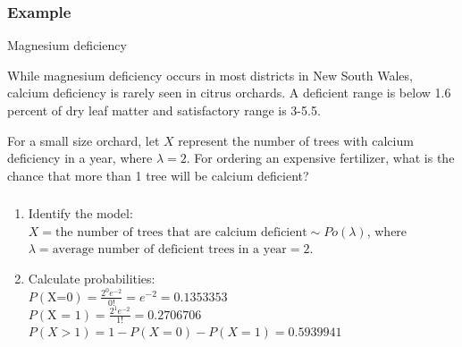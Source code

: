 \documentclass[t,xcolor=pdftex,dvipsnames,table]{beamer}
\begin{document}
\begin{frame}\frametitle{Example}
\begin{block}{Magnesium deficiency}

While magnesium deficiency occurs in most districts in New South Wales, calcium deficiency is rarely seen in citrus orchards. A deficient range is below 1.6 percent of dry leaf matter and satisfactory range is 3-5.5.

\vspace{.5cm}
For a small size orchard, let $X$ represent the number of trees with calcium deficiency in a year, where $\lambda=2$.  
For ordering an expensive fertilizer, what is the chance that more than 1 tree will be calcium deficient? 
\href{http://www.dpi.nsw.gov.au/agriculture/horticulture/citrus/management/nutrition/nutrition}{}
\end{block}
\end{frame}

\begin{frame}\frametitle{}


\begin{block}{}
\begin{enumerate}
\item Identify the model: \\
$X = \mbox{the number of trees that are calcium deficient} \sim Po(\lambda)$, where 
$\lambda= \mbox{average number of deficient trees in a year} = 2$.
\item  
Calculate probabilities: \\
$P(\mbox{X=0}) = \frac{ 2^0 e^{-2}}{0!} =e^{-2} = 0.1353353$ \\
$P(\mbox{X = 1}) =  \frac{ 2^1 e^{-2}}{1!} = 0.2706706$ \\
$P(X > 1) = 1- P(X=0) - P(X=1) = 0.5939941$
\end{enumerate}
\end{block}
\end{frame}
\end{document}
